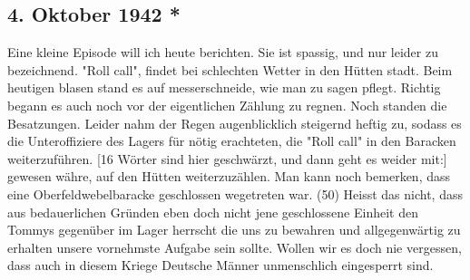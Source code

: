 \subsection{4. Oktober 1942 *}

Eine kleine Episode will ich heute berichten.
Sie ist spassig, und nur leider zu bezeichnend.
"Roll call", findet bei schlechten Wetter in den H\"{u}tten stadt.
Beim heutigen blasen stand es auf messerschneide, wie man zu sagen pflegt.
Richtig begann es auch noch vor der eigentlichen Z\"{a}hlung zu regnen.
Noch standen die Besatzungen.
Leider nahm der Regen augenblicklich steigernd heftig zu, sodass es die Unteroffiziere des Lagers f\"{u}r n\"{o}tig erachteten, die "Roll call" in den Baracken weiterzuf\"{u}hren.
{\color{red} [16 W\"{o}rter sind hier geschw\"{a}rzt, und dann geht es weider mit:] }
gewesen w\"{a}hre, auf den H\"{u}tten weiterzuz\"{a}hlen.
Man kann noch bemerken, dass eine Oberfeldwebelbaracke geschlossen wegetreten war. (50)
Heisst das nicht, dass aus bedauerlichen Gr\"{u}nden eben doch nicht jene geschlossene Einheit den Tommys gegen\"{u}ber im Lager herrscht die uns zu bewahren und allgegenw\"{a}rtig zu erhalten unsere vornehmste Aufgabe sein sollte.
Wollen wir es doch nie vergessen, dass auch in diesem Kriege Deutsche M\"{a}nner unmenschlich eingesperrt sind.

\clearpage
